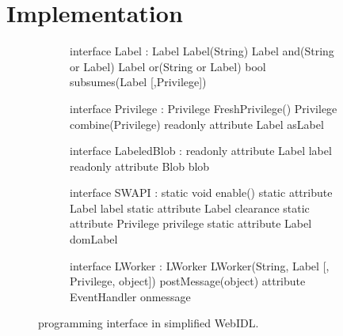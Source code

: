 \section{Implementation}
\label{sec:implementation}

\begin{figure}[t]
  \begin{subfigure}{\columnwidth}
    {\small
    \begin{webidl}
interface Label :
  Label Label(String)
  Label and(String or Label)
  Label or(String or Label)
  bool subsumes(Label [,Privilege])
    \end{webidl}
    \begin{webidl}
interface Privilege :
  Privilege FreshPrivilege()
  Privilege combine(Privilege)
  readonly attribute Label asLabel
    \end{webidl}
    }
    \vspace*{-8pt}
    \label{fig:api:policy} 
    \vspace*{8pt}
  \end{subfigure}
  \begin{subfigure}{\columnwidth}
    {\small
    \begin{webidl}
interface LabeledBlob :
  readonly attribute Label label
  readonly attribute Blob blob
    \end{webidl}
    }
    \vspace*{-8pt}
    \label{fig:api:blob} 
    \vspace*{8pt}
  \end{subfigure}
  \begin{subfigure}{\columnwidth}
    {\small
    \begin{webidl}
interface SWAPI :
  static void enable()
  static attribute Label label
  static attribute Label clearance 
  static attribute Privilege privilege
  static attribute Label domLabel
    \end{webidl}
    \begin{webidl}
interface LWorker :
  LWorker LWorker(String, Label
                  [, Privilege, object])
  postMessage(object)
  attribute EventHandler onmessage
    \end{webidl}
    }
    \vspace*{-8pt}
    \label{fig:api:compartments}
  \end{subfigure}
  \caption{\sys{} programming interface in simplified WebIDL.}
  \label{fig:api}
\end{figure}

